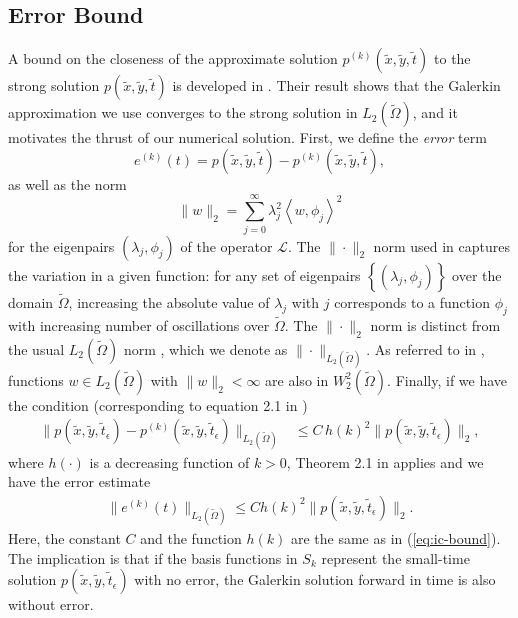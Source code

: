 \subsection{Error Bound} \label{sec:error-bound}
A bound on the closeness of the approximate solution $p^{(k)}(\tilde{x},\tilde{y},\tilde{t})$
to the strong solution $p(\tilde{x},\tilde{y},\tilde{t})$ is developed in
\cite{bramble1977some}.  Their result shows that the Galerkin
approximation we use converges to the strong solution in
$L_2(\tilde{\Omega})$, and it motivates the thrust of our numerical
solution. First, we define the \textit{error} term
\[
  e^{(k)}(t) = p(\tilde{x},\tilde{y},\tilde{t}) -
  p^{(k)}(\tilde{x},\tilde{y},\tilde{t}),
\]
as well as the norm
\[
  \| w \|_2 = \sum_{j=0}^\infty \lambda_j^2 \left<w, \phi_j\right>^2
\]
for the eigenpairs $(\lambda_j, \phi_j)$ of the operator
$\mathcal{L}$. The $\| \cdot \|_2$ norm used in \cite{bramble1977some}
captures the variation in a given function: for any set of eigenpairs
$\left\{(\lambda_j, \phi_j)\right\}$ over the domain $\tilde{\Omega}$,
increasing the absolute value of $\lambda_j$ with $j$ corresponds to a
function $\phi_j$ with increasing number of oscillations over
$\tilde{\Omega}$. The $\|\cdot\|_2$ norm is distinct from the usual
$L_2(\tilde{\Omega})$ norm , which we denote as
$\|\cdot \|_{L_2(\tilde{\Omega})}$. As referred to in
\cite{bramble1977some}, functions $w \in L_2(\tilde{\Omega})$ with
$\|w\|_2 < \infty$ are also in $W_2^2(\tilde{\Omega})$. Finally, if we
have the condition (corresponding to equation 2.1 in
\cite{bramble1977some})
\begin{align}
  \| p(\tilde{x},\tilde{y},\tilde{t}_\epsilon) - p^{(k)}(\tilde{x},\tilde{y},\tilde{t}_\epsilon) \|_{L_2(\tilde{\Omega})} &\leq C\, h(k)^2 \| p(\tilde{x},\tilde{y},\tilde{t}_\epsilon) \|_2, \label{eq:ic-bound}
\end{align}
where $h(\cdot)$ is a decreasing function of $k > 0$, Theorem 2.1 in
\cite{bramble1977some} applies and we have the error estimate
\begin{align}
  \| e^{(k)}(t) \|_{L_2(\tilde{\Omega})} \leq C h(k)^2 \| p(\tilde{x},\tilde{y},\tilde{t}_\epsilon) \|_{2}. \label{eq:error-est}
\end{align}
Here, the  constant $C$  and the  function $h(k)$ are  the same  as in
(\ref{eq:ic-bound}). The implication is that if the basis functions in
$S_k$ represent  the small-time  solution $p(\tilde{x},\tilde{y},\tilde{t}_\epsilon)$  with no
error, the Galerkin solution forward in time is also without error.

